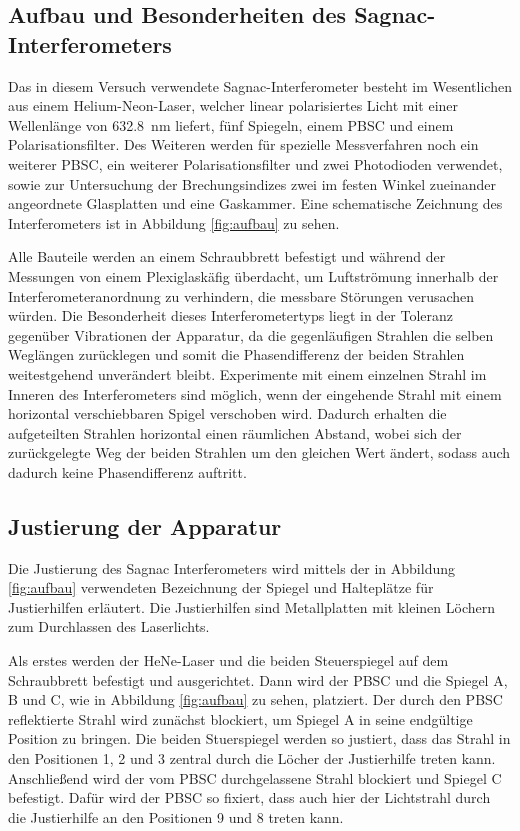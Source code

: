 \subsection{Aufbau und Besonderheiten des Sagnac-Interferometers}
Das in diesem Versuch verwendete Sagnac-Interferometer besteht im Wesentlichen aus einem Helium-Neon-Laser, welcher linear polarisiertes Licht mit einer Wellenlänge von \SI{632.8}{\nano\metre} liefert, fünf Spiegeln, einem PBSC und einem Polarisationsfilter. Des Weiteren werden für spezielle Messverfahren noch ein weiterer PBSC, ein weiterer Polarisationsfilter und zwei Photodioden verwendet, sowie zur Untersuchung der Brechungsindizes zwei im festen Winkel zueinander angeordnete Glasplatten und eine Gaskammer. Eine schematische Zeichnung des Interferometers ist in Abbildung \ref{fig:aufbau} zu sehen.

Alle Bauteile werden an einem Schraubbrett befestigt und während der Messungen von einem Plexiglaskäfig überdacht, um Luftströmung innerhalb der Interferometeranordnung zu verhindern, die messbare Störungen verusachen würden. Die Besonderheit dieses Interferometertyps liegt in der Toleranz gegenüber Vibrationen der Apparatur, da die gegenläufigen Strahlen die selben Weglängen zurücklegen und somit die Phasendifferenz der beiden Strahlen weitestgehend unverändert bleibt. Experimente mit einem einzelnen Strahl im Inneren des Interferometers sind möglich, wenn der eingehende Strahl mit einem horizontal verschiebbaren Spigel verschoben wird. Dadurch erhalten die aufgeteilten Strahlen horizontal einen räumlichen Abstand, wobei sich der zurückgelegte Weg der beiden Strahlen um den gleichen Wert ändert, sodass auch dadurch keine Phasendifferenz auftritt.

\subsection{Justierung der Apparatur}
Die Justierung des Sagnac Interferometers wird mittels der in Abbildung \ref{fig:aufbau} verwendeten Bezeichnung der Spiegel und Halteplätze für Justierhilfen erläutert. Die Justierhilfen
sind Metallplatten mit kleinen Löchern zum Durchlassen des Laserlichts.

Als erstes werden der HeNe-Laser und die beiden Steuerspiegel auf dem Schraubbrett befestigt und ausgerichtet. Dann wird der PBSC und die Spiegel A, B und C, wie in Abbildung \ref{fig:aufbau} zu sehen, platziert. Der durch den PBSC reflektierte Strahl wird zunächst blockiert, um Spiegel A in seine endgültige Position zu bringen. Die beiden Stuerspiegel werden so justiert, dass das Strahl in den Positionen 1, 2 und 3 zentral durch die Löcher der Justierhilfe treten kann. Anschließend wird der vom PBSC durchgelassene Strahl blockiert und Spiegel C befestigt. Dafür wird der PBSC so fixiert, dass auch hier der Lichtstrahl durch die Justierhilfe an den Positionen 9 und 8 treten kann.

